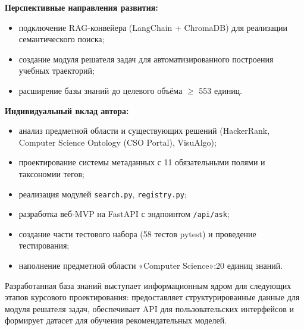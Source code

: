\textbf{Перспективные направления развития:}
\begin{itemize}
    \item подключение RAG-конвейера (LangChain + ChromaDB) для реализации семантического поиска;
    \item создание модуля решателя задач для автоматизированного построения учебных траекторий;
    \item расширение базы знаний до целевого объёма $\geq$ 553 единиц.
\end{itemize}


\textbf{Индивидуальный вклад автора:}
\begin{itemize}
    \item анализ предметной области и существующих решений (HackerRank, Computer Science Ontology (CSO Portal), VisuAlgo);
    \item проектирование системы метаданных с 11 обязательными полями и таксономии тегов;
    \item реализация модулей \texttt{search.py}, \texttt{registry.py};
    \item разработка веб-MVP на FastAPI с эндпоинтом \texttt{/api/ask};
    \item создание части тестового набора (58 тестов pytest) и проведение тестирования;
    \item наполнение предметной области «Computer Science»:20 единиц знаний.
\end{itemize}

Разработанная база знаний выступает информационным ядром для следующих этапов курсового проектирования: предоставляет структурированные данные для модуля решателя задач, обеспечивает API для пользовательских интерфейсов и формирует датасет для обучения рекомендательных моделей.